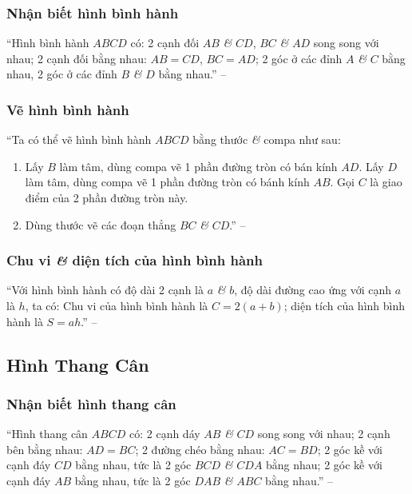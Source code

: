 \documentclass{article}
\numberwithin{equation}{section}
\begin{document}
\subsubsection{Nhận biết hình bình hành}
``Hình bình hành $ABCD$ có: 2 cạnh đối $AB$ \textit{\&} $CD$, $BC$ \textit{\&} $AD$ song song với nhau; 2 cạnh đối bằng nhau: $AB = CD$, $BC = AD$; 2 góc ở các đỉnh $A$ \textit{\&} $C$ bằng nhau, 2 góc ở các đỉnh $B$ \textit{\&} $D$ bằng nhau.'' -- \cite[p. 102]{Thai_Anh_Dat_Ha_Loan_Nam_Quang_Toan_6_tap_1}

\subsubsection{Vẽ hình bình hành}
``Ta có thể vẽ hình bình hành $ABCD$ bằng thước \textit{\&} compa như sau:
\begin{enumerate}
	\item Lấy $B$ làm tâm, dùng compa vẽ 1 phần đường tròn có bán kính $AD$. Lấy $D$ làm tâm, dùng compa vẽ 1 phần đường tròn có bánh kính $AB$. Gọi $C$ là giao điểm của 2 phần đường tròn này.
	\item Dùng thước vẽ các đoạn thẳng $BC$ \textit{\&} $CD$.'' -- \cite[p. 103]{Thai_Anh_Dat_Ha_Loan_Nam_Quang_Toan_6_tap_1}
\end{enumerate}

\subsubsection{Chu vi \textit{\&} diện tích của hình bình hành}
``Với hình bình hành có độ dài 2 cạnh là $a$ \textit{\&} $b$, độ dài đường cao ứng với cạnh $a$ là $h$, ta có: Chu vi của hình bình hành là $C = 2(a + b)$; diện tích của hình bình hành là $S = ah$.'' -- \cite[p. 103]{Thai_Anh_Dat_Ha_Loan_Nam_Quang_Toan_6_tap_1}

\subsection{Hình Thang Cân}

\subsubsection{Nhận biết hình thang cân}
``Hình thang cân $ABCD$ có: 2 cạnh dáy $AB$ \textit{\&} $CD$ song song với nhau; 2 cạnh bên bằng nhau: $AD = BC$; 2 đường chéo bằng nhau: $AC = BD$; 2 góc kề với cạnh đáy $CD$ bằng nhau, tức là 2 góc $BCD$ \textit{\&} $CDA$ bằng nhau; 2 góc kề với cạnh đáy $AB$ bằng nhau, tức là 2 góc $DAB$ \textit{\&} $ABC$ bằng nhau.'' -- \cite[p. 105]{Thai_Anh_Dat_Ha_Loan_Nam_Quang_Toan_6_tap_1}
\end{document}
